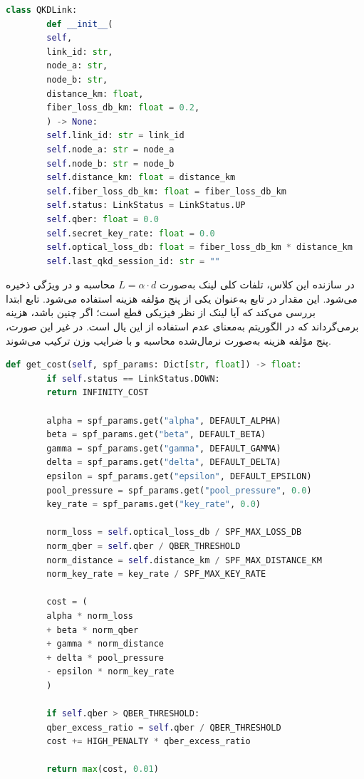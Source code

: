 \begin{LTR}
	\begin{lstlisting}[language=Python]
		class QKDLink:
		def __init__(
		self,
		link_id: str,
		node_a: str,
		node_b: str,
		distance_km: float,
		fiber_loss_db_km: float = 0.2,
		) -> None:
		self.link_id: str = link_id
		self.node_a: str = node_a
		self.node_b: str = node_b
		self.distance_km: float = distance_km
		self.fiber_loss_db_km: float = fiber_loss_db_km
		self.status: LinkStatus = LinkStatus.UP
		self.qber: float = 0.0
		self.secret_key_rate: float = 0.0
		self.optical_loss_db: float = fiber_loss_db_km * distance_km
		self.last_qkd_session_id: str = ""
	\end{lstlisting}
\end{LTR}

در سازنده این کلاس، تلفات کلی لینک به‌صورت $L = \alpha \cdot d$ محاسبه و در ویژگی  ذخیره می‌شود. این مقدار در تابع  به‌عنوان یکی از پنج مؤلفه هزینه استفاده می‌شود. تابع  ابتدا بررسی می‌کند که آیا لینک از نظر فیزیکی قطع است؛ اگر چنین باشد، هزینه  برمی‌گرداند که در الگوریتم  به‌معنای عدم استفاده از این یال است. در غیر این صورت، پنج مؤلفه هزینه به‌صورت نرمال‌شده محاسبه و با ضرایب وزن ترکیب می‌شوند.

\begin{LTR}
	\begin{lstlisting}[language=Python]
		def get_cost(self, spf_params: Dict[str, float]) -> float:
		if self.status == LinkStatus.DOWN:
		return INFINITY_COST
		
		alpha = spf_params.get("alpha", DEFAULT_ALPHA)
		beta = spf_params.get("beta", DEFAULT_BETA)
		gamma = spf_params.get("gamma", DEFAULT_GAMMA)
		delta = spf_params.get("delta", DEFAULT_DELTA)
		epsilon = spf_params.get("epsilon", DEFAULT_EPSILON)
		pool_pressure = spf_params.get("pool_pressure", 0.0)
		key_rate = spf_params.get("key_rate", 0.0)
		
		norm_loss = self.optical_loss_db / SPF_MAX_LOSS_DB
		norm_qber = self.qber / QBER_THRESHOLD
		norm_distance = self.distance_km / SPF_MAX_DISTANCE_KM
		norm_key_rate = key_rate / SPF_MAX_KEY_RATE
		
		cost = (
		alpha * norm_loss
		+ beta * norm_qber
		+ gamma * norm_distance
		+ delta * pool_pressure
		- epsilon * norm_key_rate
		)
		
		if self.qber > QBER_THRESHOLD:
		qber_excess_ratio = self.qber / QBER_THRESHOLD
		cost += HIGH_PENALTY * qber_excess_ratio
		
		return max(cost, 0.01)
	\end{lstlisting}
\end{LTR}

